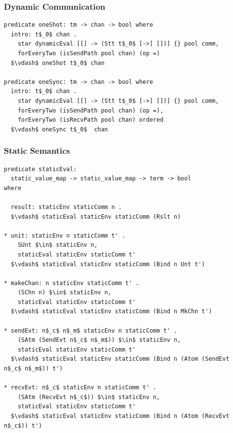 \documentclass{beamer}
\begin{document}
\begin{frame}[fragile]
	\frametitle{Dynamic Communication}
\begin{lstlisting}[language=logic, mathescape]
predicate oneShot: tm -> chan -> bool where
  intro: t$_0$ chan .
    star dynamicEval [[] -> (Stt t$_0$ [->] [])] {} pool comm,
    forEveryTwo (isSendPath pool chan) (op =)
  $\vdash$ oneShot t$_0$ chan

predicate oneSync: tm -> chan -> bool where
  intro: t$_0$ chan .
    star dynamicEval [[] -> (Stt t$_0$ [->] [])] {} pool comm,
    forEveryTwo (isSendPath pool chan) (op =),
    forEveryTwo (isRecvPath pool chan) ordered 
  $\vdash$ oneSync t$_0$  chan
\end{lstlisting}
\end{frame}


\begin{frame}[fragile]
	\frametitle{Static Semantics}
\begin{lstlisting}[language=logic, mathescape]
predicate staticEval:
  static_value_map -> static_value_map -> term -> bool
where

  result: staticEnv staticComm n .
  $\vdash$ staticEval staticEnv staticComm (Rslt n)

* unit: staticEnv n staticComm t' .
    SUnt $\in$ staticEnv n,
    staticEval staticEnv staticComm t'
  $\vdash$ staticEval staticEnv staticComm (Bind n Unt t')

* makeChan: n staticEnv staticComm t' .
    (SChn n) $\in$ staticEnv n,
    staticEval staticEnv staticComm t'
  $\vdash$ staticEval staticEnv staticComm (Bind n MkChn t')

* sendEvt: n$_c$ n$_m$ staticEnv n staticComm t' .
    (SAtm (SendEvt n$_c$ n$_m$)) $\in$ staticEnv n,
    staticEval staticEnv staticComm t' 
  $\vdash$ staticEval staticEnv staticComm (Bind n (Atom (SendEvt n$_c$ n$_m$)) t')

* recvEvt: n$_c$ staticEnv n staticComm t' . 
    (SAtm (RecvEvt n$_c$)) $\in$ staticEnv n,
    staticEval staticEnv staticComm t'
  $\vdash$ staticEval staticEnv staticComm (Bind n (Atom (RecvEvt n$_c$)) t')
\end{lstlisting}
\end{frame}
\end{document}
